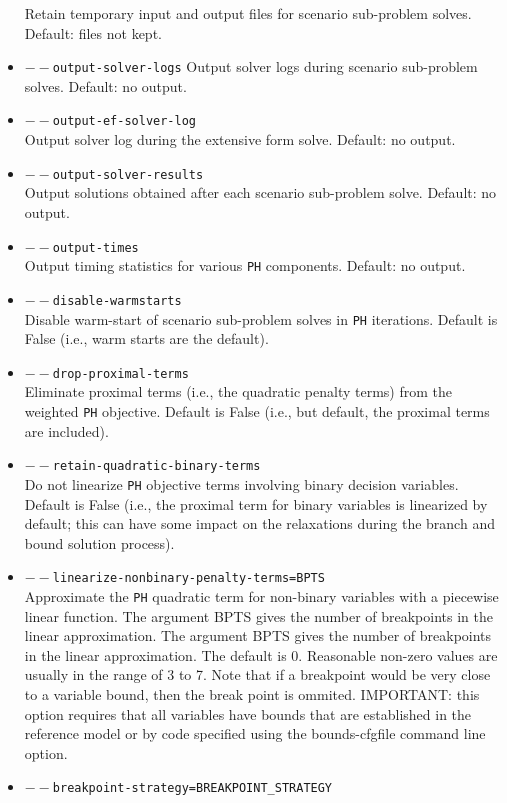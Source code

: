 \documentclass[a4paper]{article}
\begin{document}
\begin{itemize}
	Retain temporary input and output files for scenario sub-problem solves. Default: files not kept. 
	\item \texttt{$--$output-solver-logs}
	Output solver logs during scenario sub-problem solves. Default: no output. 
	\item \texttt{$--$output-ef-solver-log}\\
	Output solver log during the extensive form solve. Default: no output. 
	\item \texttt{$--$output-solver-results}\\
	Output solutions obtained after each scenario sub-problem solve. Default: no output. 
	\item \texttt{$--$output-times}\\
	Output timing statistics for various \texttt{PH} components. Default: no output. 
	\item \texttt{$--$disable-warmstarts}\\
	Disable warm-start of scenario sub-problem solves in \texttt{PH} iterations. Default is False (i.e., warm starts are the default).
	\item \texttt{$--$drop-proximal-terms}\\
	Eliminate proximal terms (i.e., the quadratic penalty terms) from the weighted \texttt{PH} objective. Default is False (i.e., but default, the proximal terms are included). 
	\item \texttt{$--$retain-quadratic-binary-terms}\\
	Do not linearize \texttt{PH} objective terms involving binary decision variables. Default is False (i.e., the proximal term for binary variables is linearized by default; this can have some impact on the relaxations during the branch and bound solution process). 
	\item \texttt{$--$linearize-nonbinary-penalty-terms=BPTS}\\
	Approximate the \texttt{PH} quadratic term for non-binary variables with a piecewise linear function. The argument BPTS gives the number of breakpoints in the linear approximation. The argument BPTS gives the number of breakpoints in the linear approximation. The default is 0. Reasonable non-zero values are usually in the range of 3 to 7. Note that if a breakpoint would be very close to a variable bound, then the break point is ommited. IMPORTANT: this option requires that all variables have bounds that are established in the reference model or by code specified using the bounds-cfgfile command line option. 
	\item \texttt{$--$breakpoint-strategy=BREAKPOINT\_STRATEGY}\\

\end{itemize}
\end{document}
